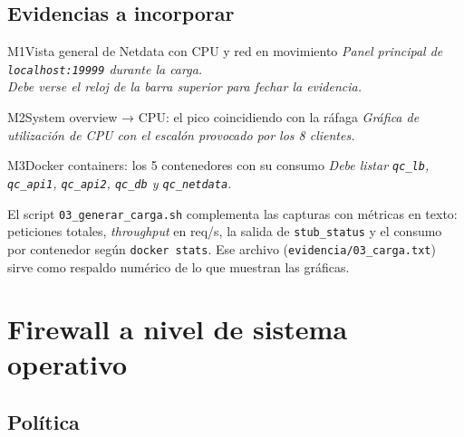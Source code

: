 \documentclass[11pt,letterpaper]{article}
\begin{document}
\subsection{Evidencias a incorporar}

\begin{captura}{M1}{Vista general de Netdata con CPU y red en movimiento}
\vspace{2.6cm}
\centering\itshape\color{qcGray}\footnotesize
Panel principal de \texttt{localhost:19999} durante la carga.\\
Debe verse el reloj de la barra superior para fechar la evidencia.
\vspace{2.4cm}
\end{captura}

\vspace{0.6em}
\begin{captura}{M2}{System overview → CPU: el pico coincidiendo con la ráfaga}
\vspace{2.2cm}
\centering\itshape\color{qcGray}\footnotesize
Gráfica de utilización de CPU con el escalón provocado por los 8 clientes.
\vspace{2.0cm}
\end{captura}

\vspace{0.6em}
\begin{captura}{M3}{Docker containers: los 5 contenedores con su consumo}
\vspace{2.2cm}
\centering\itshape\color{qcGray}\footnotesize
Debe listar \texttt{qc\_lb}, \texttt{qc\_api1}, \texttt{qc\_api2},
\texttt{qc\_db} y \texttt{qc\_netdata}.
\vspace{2.0cm}
\end{captura}

\vspace{0.8em}
\noindent El script \texttt{03\_generar\_carga.sh} complementa las capturas con
métricas en texto: peticiones totales, \emph{throughput} en req/s, la salida de
\texttt{stub\_status} y el consumo por contenedor según \texttt{docker stats}.
Ese archivo (\texttt{evidencia/03\_carga.txt}) sirve como respaldo numérico de lo
que muestran las gráficas.

\section{Firewall a nivel de sistema operativo}

\subsection{Política}
\end{document}
